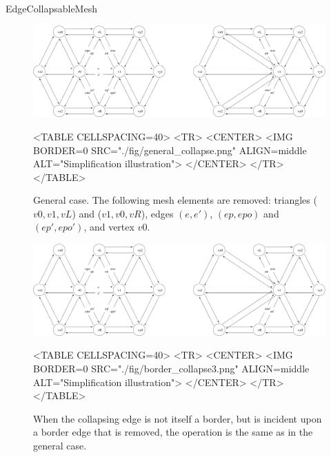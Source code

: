 \begin{ccRefConcept}{EdgeCollapsableMesh}
\begin{figure}[htpb]
\begin{ccTexOnly}
\begin{center}
\includegraphics[width=17cm]{Surface_mesh_simplification_ref/fig/general_collapse} %
\end{center}
\end{ccTexOnly}
\begin{ccHtmlOnly}
<TABLE CELLSPACING=40>
<TR>
<CENTER>
<IMG BORDER=0 SRC="./fig/general_collapse.png" ALIGN=middle ALT="Simplification illustration">
</CENTER>
</TR>
</TABLE>
\end{ccHtmlOnly}
\caption{General case. The following mesh elements are removed: triangles ($v0,v1,vL$) and ($v1,v0,vR$), edges $(e,e')$, $(ep,epo)$ and $(ep',epo')$, and vertex $v0$.}
\end{figure}



\begin{figure}[htbp]
\begin{ccTexOnly}
\begin{center}
\includegraphics[width=17cm]{Surface_mesh_simplification_ref/fig/border_collapse3} %
\end{center}
\end{ccTexOnly}
\begin{ccHtmlOnly}
<TABLE CELLSPACING=40>
<TR>
<CENTER>
<IMG BORDER=0 SRC="./fig/border_collapse3.png" ALIGN=middle ALT="Simplification illustration">
</CENTER>
</TR>
</TABLE>
\end{ccHtmlOnly}
\caption{When the collapsing edge is not itself a border, but is incident upon a border edge that is removed, the operation is the same as in the general case.}
\end{figure}


\end{ccRefConcept}
